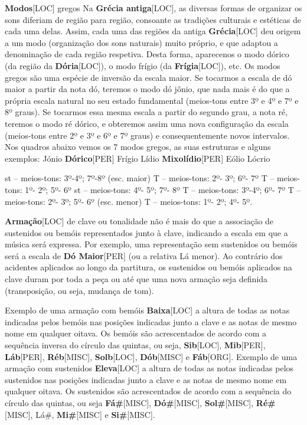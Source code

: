 \documentclass[a4paper,12pt]{article}
\begin{document}
\textbf{Modos}\textsc{[LOC]} gregos Na \textbf{Grécia antiga}\textsc{[LOC]}, as diversas formas de organizar os sons diferiam de região para região, consoante as tradições culturais e estéticas de cada uma delas. Assim, cada uma das regiões da antiga \textbf{Grécia}\textsc{[LOC]} deu origem a um modo (organização dos sons naturais) muito próprio, e que adaptou a denominação de cada região respetiva. Desta forma, aparecenos o modo dórico (da região da \textbf{Dória}\textsc{[LOC]}), o modo frígio (da \textbf{Frígia}\textsc{[LOC]}), etc. Os modos gregos são uma espécie de inversão da escala maior. Se tocarmos a escala de dó maior a partir da nota dó, teremos o modo dó jônio, que nada mais é do que a própria escala natural no seu estado fundamental (meios-tons entre 3º e 4º e 7º e 8º graus). Se tocarmos essa mesma escala a partir do segundo grau, a nota ré, teremos o modo ré dórico, e obteremos assim uma nova configuração da escala (meios-tons entre 2º e 3º e 6º e 7º graus) e consequentemente novos intervalos. Nos quadros abaixo vemos os 7 modos gregos, as suas estruturas e alguns exemplos: Jónio \textbf{Dórico}\textsc{[PER]} Frígio Lídio \textbf{Mixolídio}\textsc{[PER]} Eólio Lócrio

st -- meios-tons: 3º-4º; 7º-8º (esc. maior) T -- meios-tons: 2º- 3º; 6º- 7º T -- meios-tons: 1º- 2º; 5º- 6º st -- meios-tons: 4º- 5º; 7º- 8º T -- meios-tons: 3º-4º; 6º- 7º T -- meios-tons: 2º- 3º; 5º- 6º (esc. menor) T -- meios-tons: 1º- 2º; 4º- 5º.

\textbf{Armação}\textsc{[LOC]} de clave ou tonalidade não é mais do que a associação de sustenidos ou bemóis representados junto à clave, indicando a escala em que a música será expressa. Por exemplo, uma representação sem sustenidos ou bemóis será a escala de \textbf{Dó Maior}\textsc{[PER]} (ou a relativa Lá menor). Ao contrário dos acidentes aplicados ao longo da partitura, os sustenidos ou bemóis aplicados na clave duram por toda a peça ou até que uma nova armação seja definida (transposição, ou seja, mudança de tom).

Exemplo de uma armação com bemóis \textbf{Baixa}\textsc{[LOC]} a altura de todas as notas indicadas pelos bemóis nas posições indicadas junto a clave e as notas de mesmo nome em qualquer oitava. Os bemóis são acrescentados de acordo com a sequência inversa do círculo das quintas, ou seja, \textbf{Sib}\textsc{[LOC]}, \textbf{Mib}\textsc{[PER]}, \textbf{Láb}\textsc{[PER]}, \textbf{Réb}\textsc{[MISC]}, \textbf{Solb}\textsc{[LOC]}, \textbf{Dób}\textsc{[MISC]} e \textbf{Fáb}\textsc{[ORG]}. Exemplo de uma armação com sustenidos \textbf{Eleva}\textsc{[LOC]} a altura de todas as notas indicadas pelos sustenidos nas posições indicadas junto a clave e as notas de mesmo nome em qualquer oitava. Os sustenidos são acrescentados de acordo com a sequência do círculo das quintas, ou seja \textbf{Fá\#}\textsc{[MISC]}, \textbf{Dó\#}\textsc{[MISC]}, \textbf{Sol\#}\textsc{[MISC]}, \textbf{Ré\#}\textsc{[MISC]}, Lá\#, \textbf{Mi\#}\textsc{[MISC]} e \textbf{Si\#}\textsc{[MISC]}.
\end{document}
